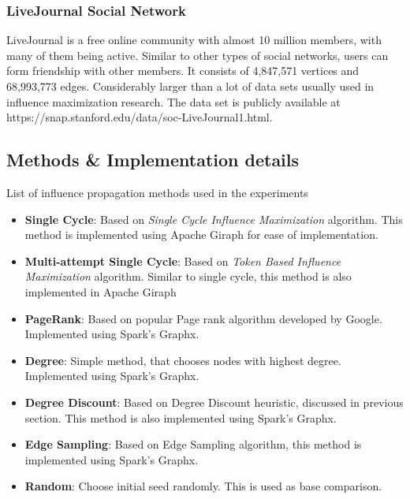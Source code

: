 \documentclass[english]{tktltiki}
\begin{document}
\subsubsection{LiveJournal Social Network}
LiveJournal is a free online community with almost 10 million members, with many of them being active. Similar to other types of social networks, users can form friendship with other members. It consists of 4,847,571 vertices and 68,993,773 edges. Considerably larger than a lot of data sets usually used in influence maximization research. The data set is publicly available at https://snap.stanford.edu/data/soc-LiveJournal1.html. 

\subsection{Methods \& Implementation details}
List of influence propagation methods used in the experiments
\begin{itemize}
\item \textbf{Single Cycle}: Based on \textit{Single Cycle Influence Maximization} algorithm. This method is implemented using Apache Giraph for ease of implementation.
\item \textbf{Multi-attempt Single Cycle}: Based on \textit{Token Based Influence Maximization} algorithm. Similar to single cycle, this method is also implemented in Apache Giraph
\item \textbf{PageRank}: Based on popular Page rank algorithm developed by Google. Implemented using Spark's Graphx.
\item \textbf{Degree}: Simple method, that chooses nodes with highest degree. Implemented using Spark's Graphx.
\item \textbf{Degree Discount}: Based on Degree Discount heuristic, discussed in previous section. This method is also implemented using Spark's Graphx.
\item \textbf{Edge Sampling}: Based on Edge Sampling algorithm, this method is implemented using Spark's Graphx.
\item \textbf{Random}: Choose initial seed randomly. This is used as base comparison. 
\end{itemize}
\end{document}
